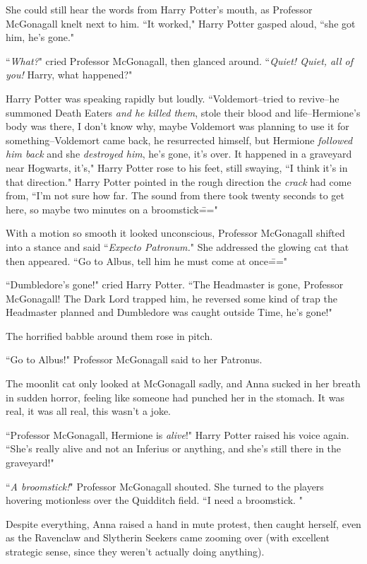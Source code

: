 She could still hear the words from Harry Potter's mouth, as Professor McGonagall knelt next to him. ``It worked," Harry Potter gasped aloud, ``she got him, he's gone."

``\emph{What?}" cried Professor McGonagall, then glanced around. ``\emph{Quiet! Quiet, all of you!} Harry, what happened?"

Harry Potter was speaking rapidly but loudly. ``Voldemort\---tried to revive\---he summoned Death Eaters \emph{and he killed them}, stole their blood and life\---Hermione's body was there, I don't know why, maybe Voldemort was planning to use it for something\---Voldemort came back, he resurrected himself, but Hermione \emph{followed him back} and she \emph{destroyed him}, he's gone, it's over. It happened in a graveyard near Hogwarts, it's," Harry Potter rose to his feet, still swaying, ``I think it's in that direction." Harry Potter pointed in the rough direction the \emph{crack} had come from, ``I'm not sure how far. The sound from there took twenty seconds to get here, so maybe two minutes on a broomstick\==="

With a motion so smooth it looked unconscious, Professor McGonagall shifted into a stance and said ``\emph{Expecto Patronum.}" She addressed the glowing cat that then appeared. ``Go to Albus, tell him he must come at once\==="

``Dumbledore's gone!" cried Harry Potter. ``The Headmaster is gone, Professor McGonagall! The Dark Lord trapped him, he reversed some kind of trap the Headmaster planned and Dumbledore was caught outside Time, he's gone!"

The horrified babble around them rose in pitch.

``Go to Albus!" Professor McGonagall said to her Patronus.

The moonlit cat only looked at McGonagall sadly, and Anna sucked in her breath in sudden horror, feeling like someone had punched her in the stomach. It was real, it was all real, this wasn't a joke.

``Professor McGonagall, Hermione is \emph{alive}!" Harry Potter raised his voice again. ``She's really alive and not an Inferius or anything, and she's still there in the graveyard!"

``\emph{A broomstick!}" Professor McGonagall shouted. She turned to the players hovering motionless over the Quidditch field. ``I need a broomstick. "

Despite everything, Anna raised a hand in mute protest, then caught herself, even as the Ravenclaw and Slytherin Seekers came zooming over (with excellent strategic sense, since they weren't actually doing anything).

